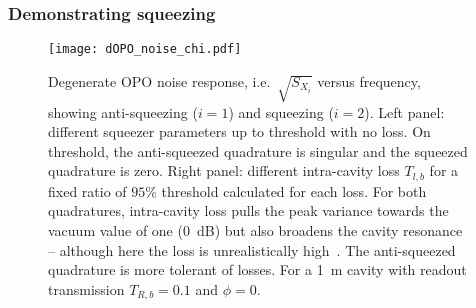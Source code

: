

\subsubsection{Demonstrating squeezing}

\begin{figure}
	\centering
	\texttt{[image: dOPO\_noise\_chi.pdf]}
	\caption{ Degenerate OPO noise response, i.e.\ $\sqrt{S_{X_i}}$ versus frequency, showing anti-squeezing ($i=1$) and squeezing ($i=2$). Left panel: different squeezer parameters up to threshold with no loss. On threshold, the anti-squeezed quadrature is singular and the squeezed quadrature is zero. Right panel: different intra-cavity loss $T_{l,b}$ for a fixed ratio of $95\%$ threshold calculated for each loss. For both quadratures, intra-cavity loss pulls the peak variance towards the vacuum value of one (0~dB) but also broadens the cavity resonance -- although here the loss is unrealistically high~\cite{}. The anti-squeezed quadrature is more tolerant of losses. For a 1~m cavity with readout transmission $T_{R,b}=0.1$ and $\phi=0$.}
	\label{fig:dOPO_variances}
\end{figure}

